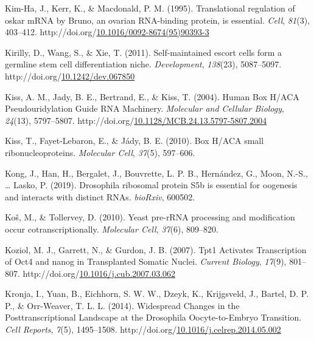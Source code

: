 \documentclass[12pt,oneside]{reedthesis}
\newlength{\cslhangindent}
\newenvironment{CSLReferences}[2] %
 {%
  \setlength{\parindent}{0pt}
  \ifodd #1 \everypar{\setlength{\hangindent}{\cslhangindent}}\ignorespaces\fi
  \ifnum #2 > 0
  \setlength{\parskip}{#2\baselineskip}
  \fi
 }%
 {}
\begin{document}
\begin{CSLReferences}{1}{0}
\leavevmode{}%
Kim-Ha, J., Kerr, K., \& Macdonald, P. M. (1995). Translational regulation of oskar {mRNA} by {Bruno}, an ovarian {RNA-binding} protein, is essential. \emph{Cell}, \emph{81}(3), 403--412. http://doi.org/\href{https://doi.org/10.1016/0092-8674(95)90393-3}{10.1016/0092-8674(95)90393-3}

\leavevmode{}%
Kirilly, D., Wang, S., \& Xie, T. (2011). Self-maintained escort cells form a germline stem cell differentiation niche. \emph{Development}, \emph{138}(23), 5087--5097. http://doi.org/\href{https://doi.org/10.1242/dev.067850}{10.1242/dev.067850}

\leavevmode{}%
Kiss, A. M., Jady, B. E., Bertrand, E., \& Kiss, T. (2004). Human {Box H}/{ACA Pseudouridylation Guide RNA Machinery}. \emph{Molecular and Cellular Biology}, \emph{24}(13), 5797--5807. http://doi.org/\href{https://doi.org/10.1128/MCB.24.13.5797-5807.2004}{10.1128/MCB.24.13.5797-5807.2004}

\leavevmode{}%
Kiss, T., Fayet-Lebaron, E., \& Jády, B. E. (2010). Box {H}/{ACA} small ribonucleoproteins. \emph{Molecular Cell}, \emph{37}(5), 597--606.

\leavevmode{}%
Kong, J., Han, H., Bergalet, J., Bouvrette, L. P. B., Hernández, G., Moon, N.-S., \ldots{} Lasko, P. (2019). Drosophila ribosomal protein {S5b} is essential for oogenesis and interacts with distinct {RNAs}. \emph{bioRxiv}, 600502.

\leavevmode{}%
Koš, M., \& Tollervey, D. (2010). Yeast pre-{rRNA} processing and modification occur cotranscriptionally. \emph{Molecular Cell}, \emph{37}(6), 809--820.

\leavevmode{}%
Koziol, M. J., Garrett, N., \& Gurdon, J. B. (2007). Tpt1 {Activates Transcription} of Oct4 and nanog in {Transplanted Somatic Nuclei}. \emph{Current Biology}, \emph{17}(9), 801--807. http://doi.org/\href{https://doi.org/10.1016/j.cub.2007.03.062}{10.1016/j.cub.2007.03.062}

\leavevmode{}%
Kronja, I., Yuan, B., Eichhorn, S. W. W., Dzeyk, K., Krijgsveld, J., Bartel, D. P. P., \& Orr-Weaver, T. L. L. (2014). Widespread {Changes} in the {Posttranscriptional Landscape} at the {Drosophila Oocyte-to-Embryo Transition}. \emph{Cell Reports}, \emph{7}(5), 1495--1508. http://doi.org/\href{https://doi.org/10.1016/j.celrep.2014.05.002}{10.1016/j.celrep.2014.05.002}


\end{CSLReferences}
\end{document}
